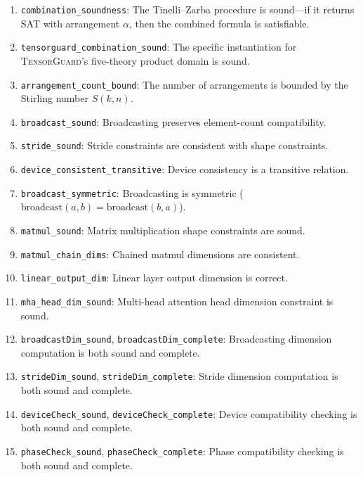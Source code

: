 \documentclass[10pt]{article}
\newcommand{\tguard}{\textsc{TensorGuard}}
\theoremstyle{plain}
\theoremstyle{definition}
\theoremstyle{remark}
\begin{document}
\begin{enumerate}[leftmargin=2em]
  \item \texttt{combination\_soundness}: The Tinelli--Zarba procedure
    is sound---if it returns SAT with arrangement $\alpha$, then the
    combined formula is satisfiable.

  \item \texttt{tensorguard\_combination\_sound}: The specific
    instantiation for \tguard{}'s five-theory product domain is
    sound.

  \item \texttt{arrangement\_count\_bound}: The number of arrangements
    is bounded by the Stirling number $S(k, n)$.

  \item \texttt{broadcast\_sound}: Broadcasting preserves
    element-count compatibility.

  \item \texttt{stride\_sound}: Stride constraints are consistent
    with shape constraints.

  \item \texttt{device\_consistent\_transitive}: Device consistency
    is a transitive relation.

  \item \texttt{broadcast\_symmetric}: Broadcasting is symmetric
    ($\text{broadcast}(a, b) = \text{broadcast}(b, a)$).

  \item \texttt{matmul\_sound}: Matrix multiplication shape
    constraints are sound.

  \item \texttt{matmul\_chain\_dims}: Chained matmul dimensions are
    consistent.

  \item \texttt{linear\_output\_dim}: Linear layer output dimension
    is correct.

  \item \texttt{mha\_head\_dim\_sound}: Multi-head attention head
    dimension constraint is sound.

  \item \texttt{broadcastDim\_sound}, \texttt{broadcastDim\_complete}:
    Broadcasting dimension computation is both sound and complete.

  \item \texttt{strideDim\_sound}, \texttt{strideDim\_complete}:
    Stride dimension computation is both sound and complete.

  \item \texttt{deviceCheck\_sound}, \texttt{deviceCheck\_complete}:
    Device compatibility checking is both sound and complete.

  \item \texttt{phaseCheck\_sound}, \texttt{phaseCheck\_complete}:
    Phase compatibility checking is both sound and complete.
\end{enumerate}
\end{document}

